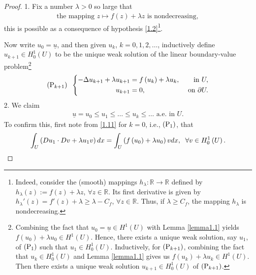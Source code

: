 \documentclass[11pt,a4paper,center,notitlepage]{article}
\numberwithin{equation}{section}
\begin{document}
\begin{proof} 1. Fix a number $\lambda >0$ so large that
\begin{align}
\label{1.10}
\mbox{the mapping } z \mapsto f\left(z\right) + \lambda z \mbox{ is nondecreasing},
\end{align}
this is possible as a consequence of hypothesis \eqref{1.2}\footnote{Indeed, consider the (smooth) mappings $h_\lambda: \mathbb{R}\to \mathbb{R}$ defined by ${h_\lambda }\left( z \right) := f\left( z \right) + \lambda z$, $\forall z \in \mathbb{R}$. Its first derivative is given by ${h_\lambda }'\left( z \right) = f'\left( z \right) + \lambda  \ge \lambda  - C_f$, $\forall z \in \mathbb{R}$. Thus, if $\lambda \ge C_f$, the mapping $h_\lambda$ is nondecreasing.}.

Now write $u_0 = \underline{u}$, and then given $u_k$, $k=0,1,2,\ldots$, inductively define $u_{k+1} \in H_0^1\left(U\right)$ to be the unique weak solution of the linear boundary-value problem\footnote{Combining the fact that $u_0=\underline{u} \in H^1\left(U\right)$ with Lemma \ref{lemma1.1} yields $f\left(u_0\right) +\lambda u_0 \in H^1\left(U\right)$. Hence, there exists a unique weak solution, say $u_1$, of $\left({\rm P}_1\right)$ such that $u_1\in H_0^1\left(U\right)$. Inductively, for $\left({\rm P}_{k+1}\right)$, combining the fact that $u_k \in H_0^1\left(U\right)$ and Lemma \ref{lemma1.1} gives us $f\left(u_k\right)+\lambda u_k \in H^1\left(U\right)$. Then there exists a unique weak solution $u_{k+1}\in H_0^1\left(U\right)$ of $\left({\rm P}_{k+1}\right)$.}
\begin{equation}
\label{1.11}
\left({\rm P}_{k+1} \right) \hspace{2mm} \left\{ \begin{split}
 - \Delta {u_{k + 1}} + \lambda {u_{k + 1}} &= f\left( {{u_k}} \right) + \lambda {u_k}, & \mbox{ in } U,\\
{u_{k + 1}} &= 0, & \mbox{ on } \partial U.
\end{split} \right.
\end{equation}
2. We claim
\begin{align}
\label{1.12}
\underline{u} = u_0 \le u_1 \le \ldots \le u_k\le \ldots \mbox{ a.e. in } U.
\end{align}
To confirm this, first note from \eqref{1.11} for $k=0$, i.e., $\left({\rm P}_1\right)$, that 
\begin{align}
\label{1.13}
\int_U {\left( {D{u_1} \cdot Dv + \lambda {u_1}v} \right)dx}  = \int_U {\left( {f\left( {{u_0}} \right) + \lambda {u_0}} \right)vdx} ,\hspace{2mm}\forall v \in H_0^1\left( U \right).

\end{align}
\end{proof}
\end{document}

